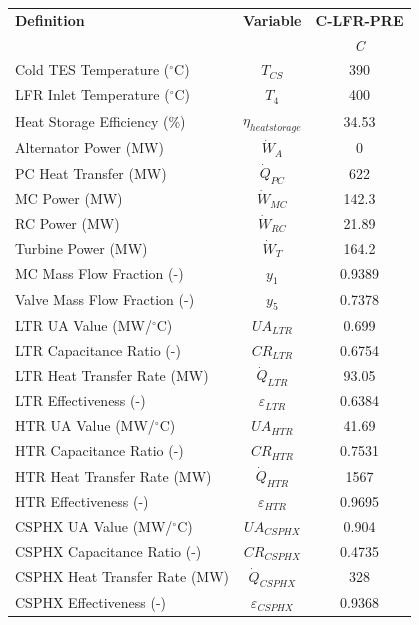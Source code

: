 \begin{paracol}{2}
\begin{specialtable}[H]
    \caption{Calculated system parameters for salt charging C-LFR-PRE cycle configuration with TES cold storage set to 663.2 K.\label{tab-c-lfr-pre}}
    \begin{tabular}{lcc}
    \toprule
    \textbf{Definition} & \textbf{Variable} & \textbf{C-LFR-PRE}\\
    & & \textit{C}\\
    \midrule	
    Cold TES Temperature ($^{\circ}$C)	&	$T_{CS}$	&	390	\\
    LFR Inlet Temperature ($^{\circ}$C)	&	$T_{4}$	&	400	\\
    Heat Storage Efficiency (\%)	&	$\eta_{heatstorage}$	&	34.53	\\
    Alternator Power (MW)	&	$\dot{W}_{A}$	&	0	\\
    PC Heat Transfer (MW)	&	$\dot{Q}_{PC}$	&	622	\\
    MC Power (MW)	&	$\dot{W}_{MC}$	&	142.3	\\
    RC Power (MW)	&	$\dot{W}_{RC}$	&	21.89	\\
    Turbine Power (MW)	&	$\dot{W}_{T}$	&	164.2	\\
    MC Mass Flow Fraction (-)	&	$y_{1}$	&	0.9389	\\
    Valve Mass Flow Fraction (-)	&	$y_{5}$	&	0.7378	\\
    LTR UA Value (MW/$^{\circ}$C)	&	$UA_{LTR}$	&	0.699	\\
    LTR Capacitance Ratio (-)	&	$CR_{LTR}$	&	0.6754	\\
    LTR Heat Transfer Rate (MW)	&	$\dot{Q}_{LTR}$	&	93.05	\\
    LTR Effectiveness (-)	&	$\varepsilon_{LTR}$	&	0.6384	\\
    HTR UA Value (MW/$^{\circ}$C)	&	$UA_{HTR}$	&	41.69	\\
    HTR Capacitance Ratio (-)	&	$CR_{HTR}$	&	0.7531	\\
    HTR Heat Transfer Rate (MW)	&	$\dot{Q}_{HTR}$	&	1567	\\
    HTR Effectiveness (-)	&	$\varepsilon_{HTR}$	&	0.9695	\\
    CSPHX UA Value (MW/$^{\circ}$C)	&	$UA_{CSPHX}$	&	0.904	\\
    CSPHX Capacitance Ratio (-)	&	$CR_{CSPHX}$	&	0.4735	\\
    CSPHX Heat Transfer Rate (MW)	&	$\dot{Q}_{CSPHX}$	&	328	\\
    CSPHX Effectiveness (-)	&	$\varepsilon_{CSPHX}$	&	0.9368	\\
    \bottomrule
    \end{tabular}\\
\end{specialtable}


\end{paracol}
